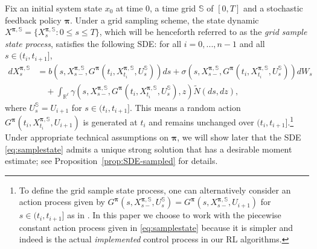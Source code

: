 \documentclass[11pt]{article}
\newcommand{\1}{\mathbbm{1}}
\newcommand{\bpi}{\boldsymbol{\pi}}
\begin{document}
Fix an initial system state $x_0$ at time 0, a time grid $\mathbb{S}$ of $[0,T]$ and a stochastic feedback policy $\bpi$. Under a grid sampling scheme, the state dynamic $X^{\bpi, \mathbb{S}} = \{X^{\bpi, \mathbb{S}}_s: 0 \le s \le T\}$, which will be henceforth referred to as the \emph{grid sample state process}, satisfies the following SDE: for all $i = 0, . . . , n - 1$ and all $s \in (t_{i}, t_{i+1}]$,
\begin{align}
d X^{\bpi, \mathbb{S}}_s &= b(s, X^{\bpi, \mathbb{S}}_{s-} ,  G^{\bpi}(t_i, X^{\bpi, \mathbb{S}}_{t_i}, U_s^{\mathbb{S}} ) ) ds + \sigma (s, X^{\bpi, \mathbb{S}}_{s-}, G^{\bpi}(t_i, X^{\bpi, \mathbb{S}}_{t_i}, U_s^{\mathbb{S}}) ) dW_s \\
& \quad + \int_{\mathbb{R}^\ell} \gamma (s, X^{\bpi, \mathbb{S}}_{s-}, G^{\bpi}(t_i, X^{\bpi, \mathbb{S}}_{t_i}, U_s^{\mathbb{S}} ), z) \widetilde N(ds, dz), \label{eq:samplestate}
\end{align}
where $U_s^{\mathbb{S}}=U_{i+1}$ for $s \in (t_{i}, t_{i+1}]$. This means a random action $G^{\bpi}(t_i, X^{\bpi, \mathbb{S}}_{t_i}, U_{i+1})$ is generated at $t_i$ and remains unchanged over $(t_{i}, t_{i+1}]$.\footnote{To define the grid sample state process, one can alternatively consider an action process given by $G^{\bpi}(s, X^{\bpi, \mathbb{S}}_{s-}, U_s^{\mathbb{S}}) = G^{\bpi}(s, X^{\bpi, \mathbb{S}}_{s-}, U_{i+1})$ for $s \in (t_{i}, t_{i+1}]$ as in \cite{bender2024continuous}. In this paper we choose to work with the piecewise constant action process given in \eqref{eq:samplestate} because it is simpler and indeed is the actual {\it implemented} control process in our RL algorithms.} Under appropriate technical assumptions on $\bpi$, we will show later that the SDE \eqref{eq:samplestate} admits a unique strong solution that has a desirable moment estimate; see Proposition~\ref{prop:SDE-sampled} for details.








\end{document}
